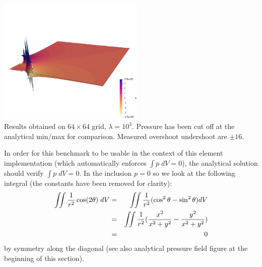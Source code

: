 \begin{center}
\includegraphics[width=7cm]{python_codes/fieldstone_161/results/bench4/press2}\\
{\captionfont Results obtained on $64\times 64$ grid, $\lambda=10^3$. 
Pressure has been cut off at the analytical min/max for comparison. 
Measured overshoot undershoot are $\pm16$.}
\end{center}

In order for this benchmark to be usable in the context of this element implementation (which 
automatically enforces $\int p \; dV=0$), 
the analytical solution should verify $\int p\; dV=0$. 
In the inclusion $p=0$ so we look at the following integral (the constants have been 
removed for clarity):
\begin{eqnarray}
\iint \frac{1}{r^2} \cos(2\theta) \; dV 
&=& \iint \frac{1}{r^2} ( \cos^2\theta - \sin^2 \theta) dV \nonumber\\
&=& \iint \frac{1}{r^2} ( \frac{x^2}{x^2+y^2} - \frac{y^2}{x^2+y^2}) \nonumber\\
&=& 0
\end{eqnarray}
by symmetry along the diagonal (see also analytical pressure field figure at the 
beginning of this section).

